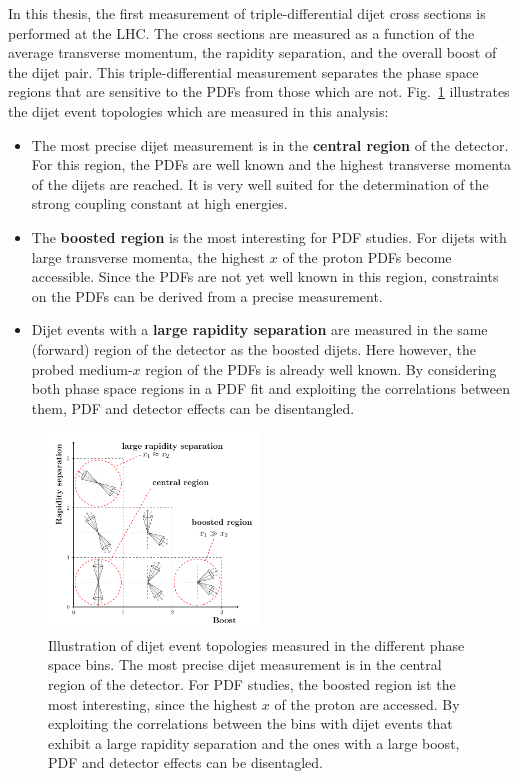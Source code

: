 In this thesis, the first measurement of triple-differential dijet cross
sections is performed at the LHC. The cross sections are measured as a function
of the average transverse momentum, the rapidity separation, and the overall
boost of the dijet pair. This triple-differential measurement separates the phase
space regions that are sensitive to the PDFs from those which are not.
Fig.~\ref{fig:intro_ybys_hint} illustrates the dijet event topologies which are
measured in this analysis:
%
\begin{itemize}
    \item The most precise dijet measurement is in the \textbf{central region}
        of the detector. For this region, the PDFs are well known and the highest transverse momenta
        of the dijets are reached. It is very well suited for the determination
        of the strong coupling constant at high energies.
    \item The \textbf{boosted region} is the most interesting for PDF studies.
        For dijets with large transverse momenta, the highest $x$ of the proton
        PDFs become accessible. Since the PDFs are not yet well known in this region,
        constraints on the PDFs can be derived from a precise
        measurement.
      \item Dijet events with a \textbf{large rapidity separation} are measured
          in the same (forward) region of the detector as the boosted dijets.
          Here however, the probed medium-$x$ region of the PDFs is already well
          known. By considering both phase space regions in a PDF fit and exploiting the
          correlations between them, PDF and detector effects
          can be disentangled.
\end{itemize}
%
\begin{figure}
    \setlength{\abovecaptionskip}{5pt plus 3pt minus 2pt}
    \centering
    \caption[Illustration of dijet topologies in the various \ystar and \yboost bins]{
             Illustration of dijet event topologies measured in the different
             phase space bins. The most precise dijet measurement is in the
             central region of the detector. For PDF studies, the boosted region
             ist the most interesting, since the highest $x$ of the proton are
             accessed. By exploiting the correlations between the bins with
             dijet events that exhibit a large rapidity separation and the ones
             with a large
             boost, PDF and detector effects can be disentagled.}
    \label{fig:intro_ybys_hint}
    \includegraphics[width=0.5\textwidth]{figures/drawings/ybys_hint.pdf}
\end{figure}
